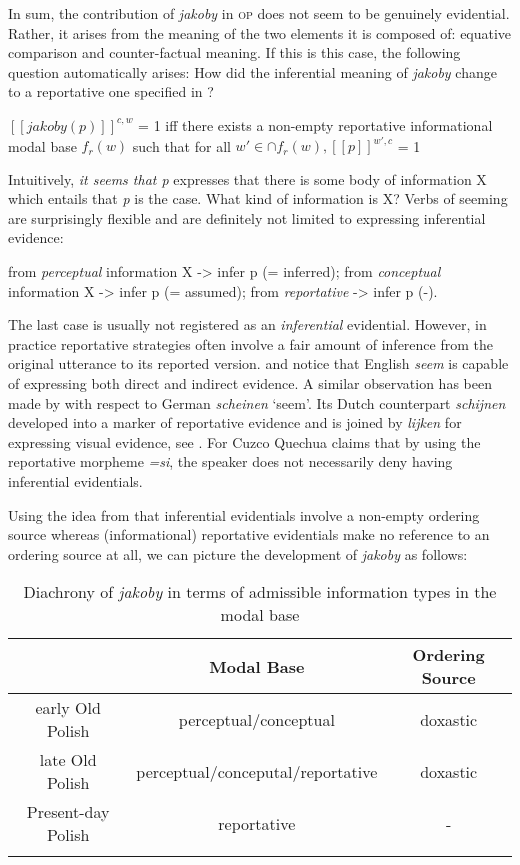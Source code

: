\documentclass[output=paper
,modfonts
,nonflat]{langsci/langscibook}
\begin{document}
In sum, the contribution of \emph{jakoby} in \textsc{op} does not seem to be genuinely evidential. Rather, it arises from the meaning of the two elements it is composed of: equative comparison and counter-factual meaning. If this is this case, the following question automatically arises: How did the inferential meaning of \emph{jakoby} change to a reportative one specified in ?

\ea	\([\![jakoby(p)]\!]^{c,w}\) = 1 iff there exists a non-empty reportative informational modal base \( f_{r}(w) \) such that for all \( w' \in \cap f_{r}(w), [[p]]^{w',c}\) = 1 \label{reportative}\z

\noindent Intuitively, \emph{it seems that p} expresses that there is some body of information X which entails that \emph{p} is the case. What kind of information is X? Verbs of seeming are surprisingly flexible and are definitely not limited to expressing inferential evidence:

\ea \ea from \emph{perceptual} information X -> infer p (= inferred);
	\ex	 from \emph{conceptual} information X -> infer p (= assumed);
	\ex	 from \emph{reportative} -> infer p (-).
\z
\z

\noindent The last case is usually not registered as an \emph{inferential} evidential. However, in practice reportative strategies often involve a fair amount of inference from the original utterance to its reported version. \textcite{Haan2007} and \textcite{Grimm2010} notice that English \emph{seem} is capable of expressing both direct and indirect evidence. A similar observation has been made by \textcite{Reis2007} with respect to German \emph{scheinen} `seem'. Its Dutch counterpart \emph{schijnen} developed into a marker of reportative evidence and is joined by \emph{lijken} for expressing visual evidence, see \textcite{Koring2013}. For Cuzco Quechua \textcite[53--55]{Faller2001} claims that by using the reportative morpheme \emph{=si}, the speaker does not necessarily deny having inferential evidentials.

Using the idea from \textcite{Faller2011} that inferential evidentials involve a non-empty ordering source whereas (informational) reportative evidentials make no reference to an ordering source at all, we can picture the development of \emph{jakoby} as follows:

\begin{table}[h]
\begin{tabular}{ccc}
\lsptoprule
{} & Modal Base & Ordering Source \\
\midrule
early Old Polish & perceptual\slash conceptual & doxastic \\
late Old Polish & perceptual\slash conceputal\slash reportative & doxastic \\
Present-day Polish & reportative & - \\
\lspbottomrule
\end{tabular}
\caption{Diachrony of \emph{jakoby} in terms of admissible information types in the modal base}
\end{table}
\end{document}
